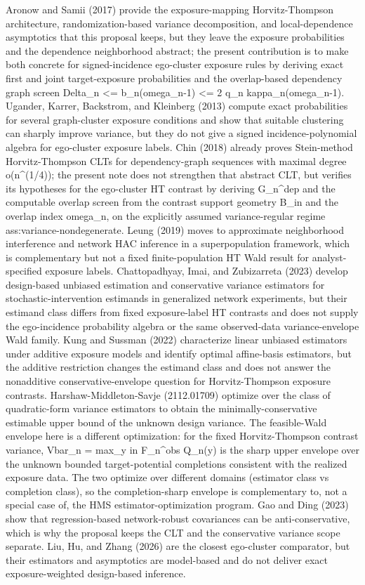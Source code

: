 \documentclass{article}
\begin{document}
Aronow and Samii (2017) provide the exposure-mapping Horvitz-Thompson architecture, randomization-based variance decomposition, and local-dependence asymptotics that this proposal keeps, but they leave the exposure probabilities and the dependence neighborhood abstract; the present contribution is to make both concrete for signed-incidence ego-cluster exposure rules by deriving exact first and joint target-exposure probabilities and the overlap-based dependency graph screen Delta_n <= b_n(omega_n-1) <= 2 q_n kappa_n(omega_n-1). Ugander, Karrer, Backstrom, and Kleinberg (2013) compute exact probabilities for several graph-cluster exposure conditions and show that suitable clustering can sharply improve variance, but they do not give a signed incidence-polynomial algebra for ego-cluster exposure labels. Chin (2018) already proves Stein-method Horvitz-Thompson CLTs for dependency-graph sequences with maximal degree o(n^(1/4)); the present note does not strengthen that abstract CLT, but verifies its hypotheses for the ego-cluster HT contrast by deriving G_n^dep and the computable overlap screen from the contrast support geometry B_in and the overlap index omega_n, on the explicitly assumed variance-regular regime ass:variance-nondegenerate. Leung (2019) moves to approximate neighborhood interference and network HAC inference in a superpopulation framework, which is complementary but not a fixed finite-population HT Wald result for analyst-specified exposure labels. Chattopadhyay, Imai, and Zubizarreta (2023) develop design-based unbiased estimation and conservative variance estimators for stochastic-intervention estimands in generalized network experiments, but their estimand class differs from fixed exposure-label HT contrasts and does not supply the ego-incidence probability algebra or the same observed-data variance-envelope Wald family. Kung and Sussman (2022) characterize linear unbiased estimators under additive exposure models and identify optimal affine-basis estimators, but the additive restriction changes the estimand class and does not answer the nonadditive conservative-envelope question for Horvitz-Thompson exposure contrasts. Harshaw-Middleton-Savje (2112.01709) optimize over the class of quadratic-form variance estimators to obtain the minimally-conservative estimable upper bound of the unknown design variance. The feasible-Wald envelope here is a different optimization: for the fixed Horvitz-Thompson contrast variance, Vbar_n = max_{y in F_n^obs} Q_n(y) is the sharp upper envelope over the unknown bounded target-potential completions consistent with the realized exposure data. The two optimize over different domains (estimator class vs completion class), so the completion-sharp envelope is complementary to, not a special case of, the HMS estimator-optimization program. Gao and Ding (2023) show that regression-based network-robust covariances can be anti-conservative, which is why the proposal keeps the CLT and the conservative variance scope separate. Liu, Hu, and Zhang (2026) are the closest ego-cluster comparator, but their estimators and asymptotics are model-based and do not deliver exact exposure-weighted design-based inference.
\end{document}
